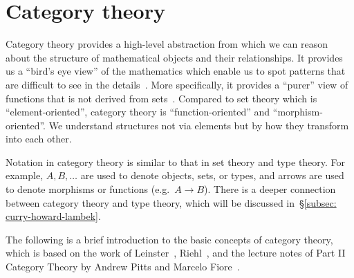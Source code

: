 \documentclass[12pt,twoside,a4paper]{report}
\theoremstyle{definition}
\theoremstyle{definition}
\theoremstyle{definition}
\theoremstyle{definition}
\newcommand{\secref}[1]{\S\ref{#1}}
\begin{document}
    \section{Category theory} \label{sec: cat}
        Category theory provides a high-level abstraction from which we can reason about the structure of mathematical objects and their relationships. It provides us a ``bird's eye view'' of the mathematics which enable us to spot patterns that are difficult to see in the details~\cite{basic_cat}. More specifically, it provides a ``purer'' view of functions that is not derived from sets~\cite{scott-lambda}. Compared to set theory which is ``element-oriented'', category theory is ``function-oriented'' and ``morphism-oriented''. We understand structures not via elements but by how they transform into each other. 

        Notation in category theory is similar to that in set theory and type theory. For example, $A, B, \dots$ are used to denote objects, sets, or types, and arrows are used to denote morphisms or functions (e.g.\ $A \to B$). There is a deeper connection between category theory and type theory, which will be discussed in~\secref{subsec: curry-howard-lambek}. 

        The following is a brief introduction to the basic concepts of category theory, which is based on the work of Leinster~\cite{basic_cat}, 
        Riehl~\cite{cat_context}, and the lecture notes of Part II Category Theory by Andrew Pitts and Marcelo Fiore~\cite{cat_lecture_notes}.
\end{document}
